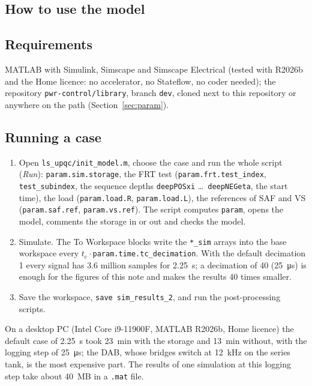 \documentclass[11pt,a4paper]{scrartcl}
\newcommand{\ped}[1]{_{\mathrm{#1}}}
\newcommand{\code}[1]{\texttt{#1}}
\begin{document}
\begin{onehalfspace}
\section{How to use the model}
\label{sec:use}

\subsection{Requirements}

MATLAB with Simulink, Simscape and Simscape Electrical (tested with R2026b and the Home licence: no accelerator, no Stateflow, no coder needed); the repository \code{pwr-control/library}, branch \code{dev}, cloned next to this repository or anywhere on the path (Section~\ref{sec:param}).

\subsection{Running a case}

\begin{enumerate}[nosep]
	\item Open \code{ls\_upqc/init\_model.m}, choose the case and run the whole script (\emph{Run}): \code{param.sim.storage}, the FRT test (\code{param.frt.test\_index}, \code{test\_subindex}, the sequence depths \code{deepPOSxi} \dots\ \code{deepNEGeta}, the start time), the load (\code{param.load.R}, \code{param.load.L}), the references of SAF and VS (\code{param.saf.ref}, \code{param.vs.ref}). The script computes \code{param}, opens the model, comments the storage in or out and checks the model.
	\item Simulate. The To Workspace blocks write the \code{*\_sim} arrays into the base workspace every $t\ped{c}\cdot$\code{param.time.tc\_decimation}. With the default decimation 1 every signal has 3.6 million samples for \SI{2.25}{s}; a decimation of 40 (\SI{25}{\micro\second}) is enough for the figures of this note and makes the results 40 times smaller.
	\item Save the workspace, \code{save sim\_results\_2}, and run the post-processing scripts.
\end{enumerate}

On a desktop PC (Intel Core i9-11900F, MATLAB R2026b, Home licence) the default case of \SI{2.25}{s} took \SI{23}{min} with the storage and \SI{13}{min} without, with the logging step of \SI{25}{\micro\second}; the DAB, whose bridges switch at \SI{12}{kHz} on the series tank, is the most expensive part. The results of one simulation at this logging step take about \SI{40}{MB} in a \code{.mat} file.


\end{onehalfspace}
\end{document}
